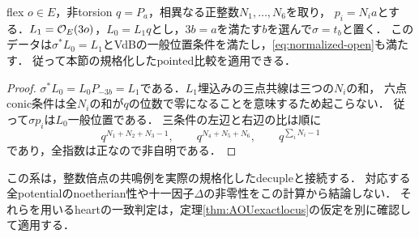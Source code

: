 \begin{corollary}[整数倍点の明示的な共通領域]\label{cor:normalized-cyclic-family}
flex $o\in E$，非torsion $q=P_a$，相異なる正整数$N_1,\ldots,N_6$を取り，
$p_i=N_i a$とする．$L_1=\mathcal O_E(3o)$，$L_0=L_1q$とし，$3b=a$を満たす$b$を選んで$\sigma=t_b$と置く．
このデータは$\sigma^*L_0=L_1$とVdBの一般位置条件を満たし，\eqref{eq:normalized-open}も満たす．
従って本節の規格化したpointed比較を適用できる．
\end{corollary}
\begin{proof}
$\sigma^*L_0=L_0P_{-3b}=L_1$である．$L_1$埋込みの三点共線は三つの$N_i$の和，
六点conic条件は全$N_i$の和が$q$の位数で零になることを意味するため起こらない．
従って$\sigma p_i$は$L_0$一般位置である．
三条件の左辺と右辺の比は順に
\[
 q^{N_1+N_2+N_3-1},\qquad
 q^{N_4+N_5+N_6},\qquad
 q^{\sum_iN_i-1}
\]
であり，全指数は正なので非自明である．
\end{proof}
\begin{remark}
この系は，整数倍点の共鳴例を実際の規格化したdecupleと接続する．
対応する全potentialのnoetherian性や十一因子$\Delta$の非零性をこの計算から結論しない．
それらを用いるheartの一致判定は，定理\ref{thm:AOUexactlocus}の仮定を別に確認して適用する．
\end{remark}
